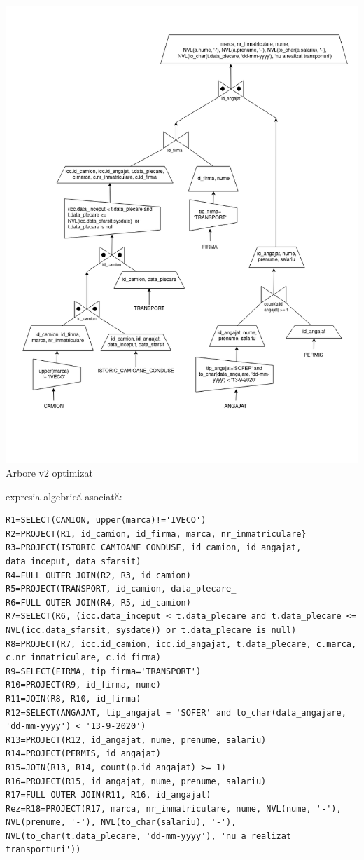 \documentclass[12pt, a4paper]{article}
\begin{document}
\includegraphics[width=\textwidth]{arbore_v2.png}
\label{arbore_v2}
\centering Arbore v2 optimizat

\newpage{} expresia algebrică asociată:
\begin{lstlisting}
R1=SELECT(CAMION, upper(marca)!='IVECO')
R2=PROJECT(R1, id_camion, id_firma, marca, nr_inmatriculare}
R3=PROJECT(ISTORIC_CAMIOANE_CONDUSE, id_camion, id_angajat, data_inceput, data_sfarsit)
R4=FULL OUTER JOIN(R2, R3, id_camion)
R5=PROJECT(TRANSPORT, id_camion, data_plecare_
R6=FULL OUTER JOIN(R4, R5, id_camion)
R7=SELECT(R6, (icc.data_inceput < t.data_plecare and t.data_plecare <= NVL(icc.data_sfarsit, sysdate)) or t.data_plecare is null)
R8=PROJECT(R7, icc.id_camion, icc.id_angajat, t.data_plecare, c.marca, c.nr_inmatriculare, c.id_firma)
R9=SELECT(FIRMA, tip_firma='TRANSPORT')
R10=PROJECT(R9, id_firma, nume)
R11=JOIN(R8, R10, id_firma)
R12=SELECT(ANGAJAT, tip_angajat = 'SOFER' and to_char(data_angajare, 'dd-mm-yyyy') < '13-9-2020')
R13=PROJECT(R12, id_angajat, nume, prenume, salariu)
R14=PROJECT(PERMIS, id_angajat)
R15=JOIN(R13, R14, count(p.id_angajat) >= 1)
R16=PROJECT(R15, id_angajat, nume, prenume, salariu)
R17=FULL OUTER JOIN(R11, R16, id_angajat)
Rez=R18=PROJECT(R17, marca, nr_inmatriculare, nume, NVL(nume, '-'), NVL(prenume, '-'), NVL(to_char(salariu), '-'), NVL(to_char(t.data_plecare, 'dd-mm-yyyy'), 'nu a realizat transporturi'))
\end{lstlisting}
\end{document}
